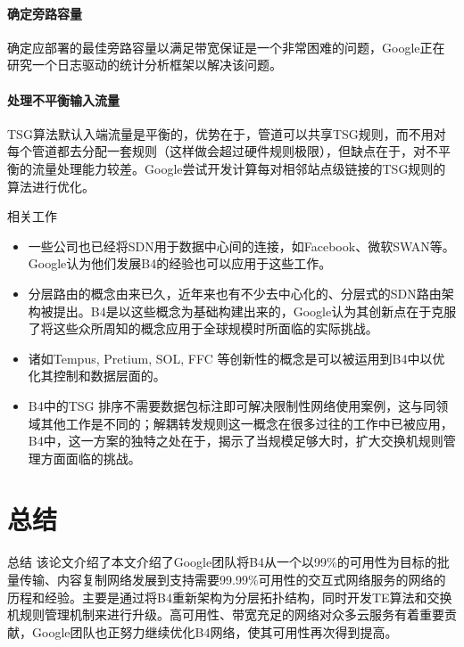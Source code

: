 \begin{frame}
    \paragraph{确定旁路容量} 确定应部署的最佳旁路容量以满足带宽保证是一个非常困难的问题，Google正在研究一个日志驱动的统计分析框架以解决该问题。

    \paragraph{处理不平衡输入流量} TSG算法默认入端流量是平衡的，优势在于，管道可以共享TSG规则，而不用对每个管道都去分配一套规则（这样做会超过硬件规则极限），但缺点在于，对不平衡的流量处理能力较差。Google尝试开发计算每对相邻站点级链接的TSG规则的算法进行优化。
\end{frame}

\begin{frame}{相关工作}
    \begin{itemize}[<+->]
        \item {}  一些公司也已经将SDN用于数据中心间的连接，如Facebook、微软SWAN等。Google认为他们发展B4的经验也可以应用于这些工作。

        \item {} 分层路由的概念由来已久，近年来也有不少去中心化的、分层式的SDN路由架构被提出。B4是以这些概念为基础构建出来的，Google认为其创新点在于克服了将这些众所周知的概念应用于全球规模时所面临的实际挑战。

        \item {} 诸如Tempus, Pretium, SOL, FFC 等创新性的概念是可以被运用到B4中以优化其控制和数据层面的。

        \item {} B4中的TSG 排序不需要数据包标注即可解决限制性网络使用案例，这与同领域其他工作是不同的；解耦转发规则这一概念在很多过往的工作中已被应用，B4中，这一方案的独特之处在于，揭示了当规模足够大时，扩大交换机规则管理方面面临的挑战。
    \end{itemize}

\end{frame}

\section{总结}
\begin{frame}{总结}
    该论文介绍了本文介绍了Google团队将B4从一个以\alert{99\%}的可用性为目标的批量传输、内容复制网络发展到支持需要\alert{99.99\%}可用性的交互式网络服务的网络的历程和经验。主要是通过将B4重新架构为分层拓扑结构，同时开发TE算法和交换机规则管理机制来进行升级。高可用性、带宽充足的网络对众多云服务有着重要贡献，Google团队也正努力继续优化B4网络，使其可用性再次得到提高。
\end{frame}

